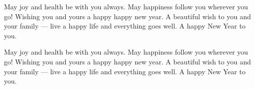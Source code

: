 {May joy and health be with you always. May happiness follow you wherever you go! Wishing you and yours a happy happy new year. A beautiful wish to you and your family --- live a happy life and everything goes well. A happy New Year to you. 

May joy and health be with you always. May happiness follow you wherever you go! Wishing you and yours a happy happy new year. A beautiful wish to you and your family --- live a happy life and everything goes well. A happy New Year to you. 

}

\makeenabstract